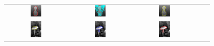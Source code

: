 \begin{figure}[t]
\begin{tabular}{@{}ccccc@{}}
\includegraphics[width=0.19\textwidth]{images/L2S_compare_region/SIM2_Lankton}		&
\includegraphics[width=0.19\textwidth]{images/L2S_compare_region/SIM2_Li}	&
\includegraphics[width=0.19\textwidth]{images/L2S_compare_region/SIM2_ours}	
\\
\includegraphics[width=0.19\textwidth]{images/L2S_compare_region/mushroom_orig}	&
\includegraphics[width=0.19\textwidth]{images/L2S_compare_region/mushroom_CV}	&
\includegraphics[width=0.19\textwidth]{images/L2S_compare_region/mushroom_Lankton} &

\end{tabular}
\end{figure}
